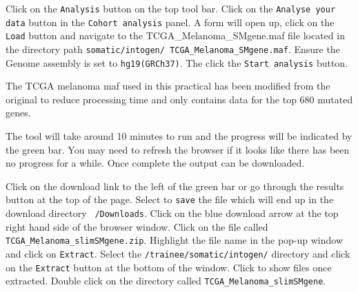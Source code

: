 \begin{steps}
Click on the \texttt{Analysis} button on the top tool bar. 
Click on the \texttt{Analyse your data} button in the \texttt{Cohort analysis} panel.
\vspace{4 mm}
A form will open up, click on the \texttt{Load} button and navigate to the
TCGA\_Melanoma\_SMgene.maf file located in the directory path 
\texttt{somatic/intogen/ TCGA\_Melanoma\_SMgene.maf}.
\vspace{4 mm}
Ensure the Genome assembly is set to \texttt{hg19(GRCh37)}.
\vspace{4 mm}
The click the \texttt{Start analysis} button.
\end{steps}

\begin{note}
The TCGA melanoma maf used in this practical has been modified from the original
to reduce processing time and only contains data for the top 680 mutated genes.
\end{note}

\begin{information}
The tool will take around 10 minutes to run and the progress will be indicated
by the green bar. You may need to refresh the browser if it looks like there
has been no progress for a while.
\vspace{4 mm}
Once complete the output can be downloaded.
\end{information}

\begin{steps}
Click on the download link to the left of the green bar or go through the
results button at the top of the page.
\vspace{4 mm}
Select to \texttt{save} the file which will end up in the download
directory \texttt{~/Downloads}.
\vspace{4 mm}
Click on the blue download arrow at the top right hand side of the browser window.
\vspace{4 mm}
Click on the file called \texttt{TCGA\_Melanoma\_slimSMgene.zip}.
\vspace{4 mm}
Highlight the file name in the pop-up window and click on \texttt{Extract}.
\vspace{4 mm}
Select the \texttt{/trainee/somatic/intogen/} directory and click on the
\texttt{Extract} button at the bottom of the window.
\vspace{4 mm}
Click to show files once extracted.
\vspace{4 mm}
Double click on the directory called \texttt{TCGA\_Melanoma\_slimSMgene}.
\end{steps}


